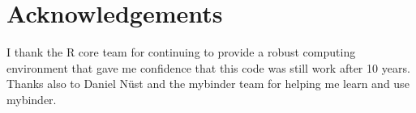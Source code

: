 \hypertarget{acknowledgements}{%
\section{Acknowledgements}\label{acknowledgements}}

I thank the R core team for continuing to provide a robust computing
environment that gave me confidence that this code was still work after
10 years. Thanks also to Daniel Nüst and the mybinder team for helping
me learn and use mybinder.

